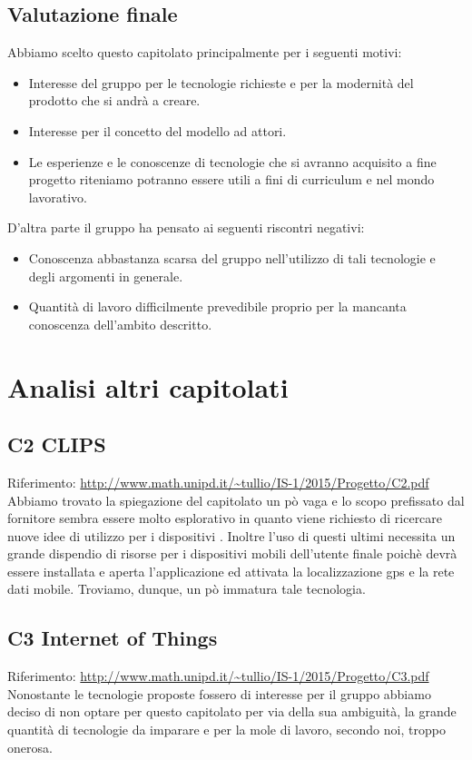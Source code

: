 \documentclass{scalatekids-article}
\begin{document}
\subsection{Valutazione finale}
Abbiamo scelto questo capitolato principalmente per i seguenti motivi:
\begin{itemize}
\item Interesse del gruppo per le tecnologie richieste e per la modernità del prodotto che si andrà a creare.
\item Interesse per il concetto del modello ad attori.
\item Le esperienze e le conoscenze di tecnologie che si avranno acquisito a fine progetto riteniamo potranno essere utili a fini di curriculum e nel mondo lavorativo.
\end{itemize}
D'altra parte il gruppo ha pensato ai seguenti riscontri negativi:
\begin{itemize}
\item Conoscenza abbastanza scarsa del gruppo nell'utilizzo di tali tecnologie e degli argomenti in generale.
\item Quantità di lavoro difficilmente prevedibile proprio per la mancanta conoscenza dell'ambito descritto.
\end{itemize}

\section{Analisi altri capitolati}
\subsection{C2 CLIPS}
Riferimento: \url{http://www.math.unipd.it/~tullio/IS-1/2015/Progetto/C2.pdf}\\
Abbiamo trovato la spiegazione del capitolato un pò vaga e lo scopo prefissato
dal fornitore sembra essere molto esplorativo in quanto viene richiesto di
ricercare nuove idee di utilizzo per i dispositivi . Inoltre l'uso di
questi ultimi necessita un grande dispendio di risorse per i dispositivi mobili
dell'utente finale poichè devrà essere installata e aperta l'applicazione ed
attivata la localizzazione gps e la rete dati mobile. Troviamo, dunque, un pò
immatura tale tecnologia.
\subsection{C3 Internet of Things}
Riferimento: \url{http://www.math.unipd.it/~tullio/IS-1/2015/Progetto/C3.pdf}\\
Nonostante le tecnologie proposte fossero di interesse per il gruppo abbiamo
deciso di non optare per questo capitolato per via della sua ambiguità, la
grande quantità di tecnologie da imparare e per la mole di lavoro, secondo noi,
troppo onerosa.
\end{document}
